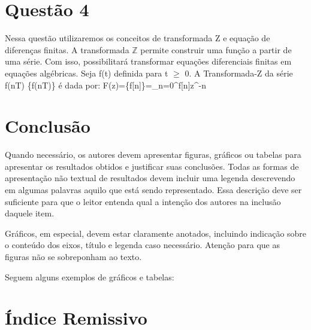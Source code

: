 \documentclass[12pt,a4paper]{report}
\begin{document}
\section{Questão 4}
Nessa questão utilizaremos os conceitos de transformada Z e equação de diferenças finitas. A transformada 
$\mathbb{Z}$ permite construir uma função a partir de uma série. Com isso, possibilitará transformar equações diferenciais finitas em equações algébricas.
Seja f(t) definida para t $\ge$ 0. A Transformada-Z da série {f(nT)}
{\displaystyle \{f(nT)\}} é dada por: {\displaystyle F(z)={}\{f[n]\}=\sum _{n=0}^{\infty}f[n]z^{-n}}

\section{Conclusão}

Quando necessário, os autores devem apresentar figuras, gráficos ou tabelas para apresentar os resultados obtidos e justificar suas conclusões. Todas as formas de apresentação não textual de resultados devem incluir uma legenda descrevendo em algumas palavras aquilo que está sendo representado. Essa descrição deve ser suficiente para que o leitor entenda qual a intenção dos autores na inclusão daquele item.

Gráficos, em especial, devem estar claramente anotados, incluindo indicação sobre o conteúdo dos eixos, título e legenda caso necessário. Atenção para que as figuras não se sobreponham ao texto.

Seguem alguns exemplos de gráficos e tabelas:

\section*{Índice Remissivo}
\end{document}
